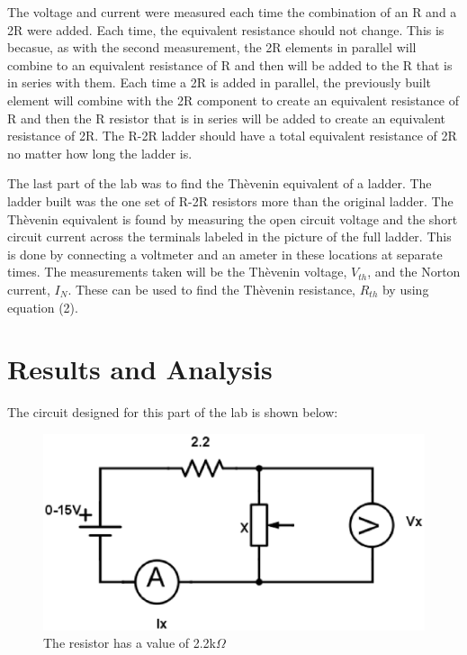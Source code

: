 \documentclass[twocolumn, amsmath]{revtex4}
\begin{document}
The voltage and current were measured each time the combination of an R and a 2R were added. Each time, the equivalent resistance should not change. This is becasue, as with the second measurement, the 2R elements in parallel will combine to an equivalent resistance of R and then will be added to the R that is in series with them. Each time a 2R is added in parallel, the previously built element will combine with the 2R component to create an equivalent resistance of R and then the R resistor that is in series will be added to create an equivalent resistance of 2R. The R-2R ladder should have a total equivalent resistance of 2R no matter how long the ladder is.

The last part of the lab was to find the Th\`{e}venin equivalent of a ladder. The ladder built was the one set of R-2R resistors more than the original ladder. The Th\`{e}venin equivalent is found by measuring the open circuit voltage and the short circuit current across the terminals labeled in the picture of the full ladder. This is done by connecting a voltmeter and an ameter in these locations at separate times. The measurements taken will be the Th\`{e}venin voltage, $V_{th}$, and the Norton current, $I_N$. These can be used to find the Th\`{e}venin resistance, $R_{th}$ by using equation (2).

\section{Results and Analysis}
The circuit designed for this part of the lab is shown below:

\begin{figure}[h]  

\includegraphics[scale = 0.4]{par1.eps}  
\caption{The resistor has a value of 2.2k$\Omega$}
\end{figure}
\end{document}
